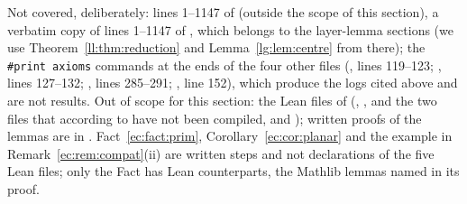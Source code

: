 Not covered, deliberately: lines 1--1147 of  (outside the scope of this
section), a verbatim copy of lines 1--1147 of , which belongs to the layer-lemma
sections (we use Theorem~\ref{ll:thm:reduction} and Lemma~\ref{lg:lem:centre} from there); the \texttt{\#print axioms}
commands at the ends of the four other files (, lines 119--123;
, lines 127--132; , lines 285--291;
, line 152), which produce the logs cited above and are not results. Out of
scope for this section: the Lean files of  (,
, and the two files that according to  have
not been compiled,  and
); written proofs of the  lemmas are in
. Fact~\ref{ec:fact:prim}, Corollary~\ref{ec:cor:planar} and the example in
Remark~\ref{ec:rem:compat}(ii) are written steps and not declarations of the five Lean files; only the Fact has Lean
counterparts, the Mathlib lemmas named in its proof.
\endgroup
